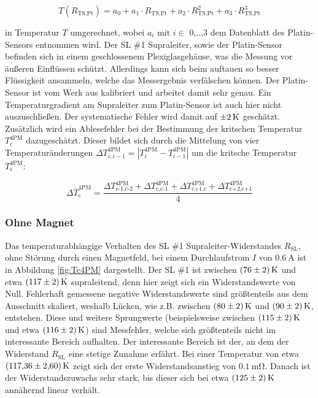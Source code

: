 \begin{equation*}
  T(R_{\text{TS,Pt}}) = a_0 + a_1 \cdot R_{\text{TS,Pt}} + a_2 \cdot R_{\text{TS,Pt}}^2
  + a_3 \cdot R_{\text{TS,Pt}}^3
  \label{FA2}
\end{equation*}

\noindent
in Temperatur $T$ umgerechnet, wobei $a_{i}$ mit $i \in$ {0,..,3} dem
Datenblatt des Platin-Sensors entnommen wird. Der SL \#1 Supraleiter, sowie
der Platin-Sensor befinden sich in einem geschlossenem Plexiglasgehäuse, was
die Messung vor äußeren Einflüssen schützt. Allerdings kann sich beim auftauen
so besser Flüssigkeit ansammeln, welche das Messergebnis verfälschen können.
Der Platin-Sensor ist vom Werk aus kalibriert und arbeitet damit sehr genau.
Ein Temperaturgradient am Supraleiter zum Platin-Sensor ist auch hier nicht
auszuschließen. Der systematische Fehler wird damit auf $\SI{\pm2}{\kelvin}$
geschätzt. Zusätzlich wird ein Ablesefehler bei der Bestimmung der kritschen
Temperatur $T^{\text{4PM}}_{\text{c}}$ dazugeschätzt. Dieser bildet sich durch
die Mittelung von vier Temperaturänderungen $\Delta T^{\text{4PM}}_{i,i-1}
= |T^{\text{4PM}}_{i}-T^{\text{4PM}}_{i-1}|$
um die kritsche Temperatur $T^{\text{4PM}}_{\text{c}}$:

\begin{equation*}
	\Delta \bar{T}^{\text{4PM}}_{\text{c}} = \frac{
																								 \Delta T^{\text{4PM}}_{\text{c-1,c-2}}
																								+\Delta T^{\text{4PM}}_{\text{c,c-1}}
																								+\Delta T^{\text{4PM}}_{\text{c+1,c}}
																								+\Delta T^{\text{4PM}}_{\text{c+2,c+1}}
																								}
																								{4}
\label{FA3}
\end{equation*}

\noindent

\subsubsection{Ohne Magnet}
\label{sec:ohneB}

Das temperaturabhängige Verhalten des SL \#1 Supraleiter-Widerstandes $R_{\text{SL}}$,
ohne Störung durch einen Magnetfeld, bei einem Durchlaufstrom
$I$ von $\SI{0.6}{\ampere}$ ist in Abbildung \ref{fig:Tc4PM} dargestellt. Der
SL \#1 ist zwischen $\SI{76\pm2}{\kelvin}$ und etwa $\SI{117\pm2}{\kelvin}$ supraleitend,
denn hier zeigt sich ein Widerstandswerte von Null. Fehlerhaft gemessene negative
Widerstandswerte sind größtenteils
aus dem Ausschnitt skaliert, weshalb Lücken, wie z.B. zwischen $\SI{80\pm2}{\kelvin}$
und $\SI{90\pm2}{\kelvin}$, entstehen. Diese und weitere Sprungwerte (beispielsweise
zwischen $\SI{115\pm2}{\kelvin}$ und etwa $\SI{116\pm2}{\kelvin}$) sind Messfehler, welche
sich größtenteils nicht im interessante Bereich aufhalten. Der interessante Bereich
ist der, an dem der Widerstand $R_{\text{SL}}$ eine stetige Zunahme erfährt.
Bei einer Temperatur von etwa $\SI{117,36\pm2,60}{\kelvin}$ zeigt sich der erste
Widerstandsanstieg von $\SI{0,1}{\milli\ohm}$. Danach ist der Widerstandszuwachs
sehr stark, bis dieser sich bei etwa $\SI{125\pm2}{\kelvin}$ annähernd linear
verhält.


